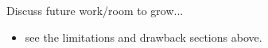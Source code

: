 \documentclass{sigchi}
\begin{document}
Discuss future work/room to grow...
\begin{itemize}
    \item see the limitations and drawback sections above. 
\end{itemize}


\balance{}



\end{document}
